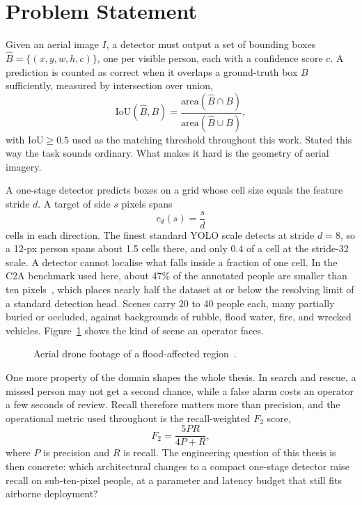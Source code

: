 \section{Problem Statement}
Given an aerial image $I$, a detector must output a set of bounding boxes
$\hat{B} = \{(x, y, w, h, c)\}$, one per visible person, each with a confidence
score $c$. A prediction is counted as correct when it overlaps a ground-truth
box $B$ sufficiently, measured by intersection over union,
\begin{equation}
  \mathrm{IoU}(\hat{B}, B) =
    \frac{\mathrm{area}(\hat{B} \cap B)}{\mathrm{area}(\hat{B} \cup B)},
  \label{eq:iou}
\end{equation}
with $\mathrm{IoU} \geq 0.5$ used as the matching threshold throughout this
work. Stated this way the task sounds ordinary. What makes it hard is the
geometry of aerial imagery.

A one-stage detector predicts boxes on a grid whose cell size equals the
feature stride $d$. A target of side $s$ pixels spans
\begin{equation}
  c_d(s) = \frac{s}{d}
  \label{eq:coverage}
\end{equation}
cells in each direction. The finest standard YOLO scale detects at stride
$d = 8$, so a 12-px person spans about 1.5 cells there, and only 0.4 of a cell
at the stride-32 scale. A detector cannot localise what falls inside a
fraction of one cell. In the C2A benchmark used here, about 47\% of the
annotated people are smaller than ten pixels~\cite{nihal2024c2a}, which places
nearly half the dataset at or below the resolving limit of a standard
detection head. Scenes carry 20 to 40 people each, many partially buried or
occluded, against backgrounds of rubble, flood water, fire, and wrecked
vehicles. Figure~\ref{fig:introscene} shows the kind of scene an operator
faces.

\begin{figure}[tbp]
  \centering
  \caption{Aerial drone footage of a flood-affected region~\cite{agiindia2024drones}.}
  \label{fig:introscene}
\end{figure}

One more property of the domain shapes the whole thesis. In search and rescue,
a missed person may not get a second chance, while a false alarm costs an
operator a few seconds of review. Recall therefore matters more than
precision, and the operational metric used throughout is the recall-weighted
$F_2$ score,
\begin{equation}
  F_2 = \frac{5PR}{4P + R},
  \label{eq:f2}
\end{equation}
where $P$ is precision and $R$ is recall. The engineering question of this
thesis is then concrete: which architectural changes to a compact one-stage
detector raise recall on sub-ten-pixel people, at a parameter and latency
budget that still fits airborne deployment?

